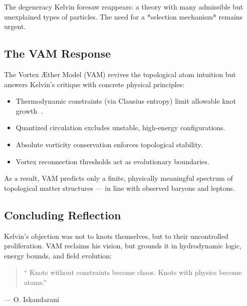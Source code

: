    The degeneracy Kelvin foresaw reappears: a theory with many admissible but unexplained types of particles. The need for a *selection mechanism* remains urgent.

   \subsection*{The VAM Response}

   The Vortex Æther Model (VAM) revives the topological atom intuition but answers Kelvin's critique with concrete physical principles:

   \begin{itemize}
     \item Thermodynamic constraints (via Clausius entropy) limit allowable knot growth~\cite{clausius1865entropy}.
     \item Quantized circulation excludes unstable, high-energy configurations.
     \item Absolute vorticity conservation enforces topological stability.
     \item Vortex reconnection thresholds act as evolutionary boundaries.
   \end{itemize}

   As a result, VAM predicts only a finite, physically meaningful spectrum of topological matter structures — in line with observed baryons and leptons.

   \subsection*{Concluding Reflection}

   Kelvin's objection was not to knots themselves, but to their uncontrolled proliferation. VAM reclaims his vision, but grounds it in hydrodynamic logic, energy bounds, and field evolution:

   \begin{quote}
    `` Knots without constraints become chaos. Knots with physics become atoms.''
   \end{quote}
      \begin{flushright}
      — O. Iskandarani
      \end{flushright}